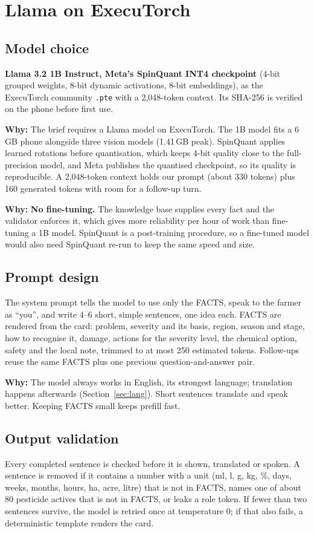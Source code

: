 \documentclass[11pt,a4paper]{article}
\newcommand{\why}[1]{\par\smallskip\noindent\colorbox{leaflight}{\parbox{\dimexpr\linewidth-2\fboxsep}{\small\textbf{\color{leaf}Why:} #1}}\par\smallskip}
\begin{document}
\section{Llama on ExecuTorch}\label{sec:llm}

\subsection{Model choice}
\textbf{Llama 3.2 1B Instruct, Meta's SpinQuant INT4 checkpoint} (4-bit grouped weights, 8-bit dynamic activations,
8-bit embeddings), as the ExecuTorch community \texttt{.pte} with a 2,048-token context. Its SHA-256 is verified on the
phone before first use.

\why{The brief requires a Llama model on ExecuTorch. The 1B model fits a 6\,GB phone alongside three vision models
(1.41\,GB peak). SpinQuant applies learned rotations before quantisation, which keeps 4-bit quality close to the
full-precision model, and Meta publishes the quantised checkpoint, so its quality is reproducible. A 2,048-token context
holds our prompt (about 330 tokens) plus 160 generated tokens with room for a follow-up turn.}

\why{\textbf{No fine-tuning.} The knowledge base supplies every fact and the validator enforces it, which gives more
reliability per hour of work than fine-tuning a 1B model. SpinQuant is a post-training procedure, so a fine-tuned model
would also need SpinQuant re-run to keep the same speed and size.}

\subsection{Prompt design}
The system prompt tells the model to use only the FACTS, speak to the farmer as ``you'', and write 4--6 short, simple
sentences, one idea each. FACTS are rendered from the card: problem, severity and its basis, region, season and stage,
how to recognise it, damage, actions for the severity level, the chemical option, safety and the local note, trimmed to
at most 250 estimated tokens. Follow-ups reuse the same FACTS plus one previous question-and-answer pair.

\why{The model always works in English, its strongest language; translation happens afterwards (Section~\ref{sec:lang}).
Short sentences translate and speak better. Keeping FACTS small keeps prefill fast.}

\subsection{Output validation}
Every completed sentence is checked before it is shown, translated or spoken. A sentence is removed if it contains a
number with a unit (ml, l, g, kg, \%, days, weeks, months, hours, ha, acre, litre) that is not in FACTS, names one of
about 80 pesticide actives that is not in FACTS, or leaks a role token. If fewer than two sentences survive, the model
is retried once at temperature 0; if that also fails, a deterministic template renders the card.
\end{document}
